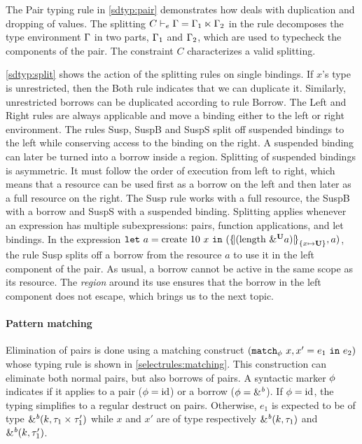 The {\sc Pair} typing rule in \cref{sdtyp:pair} demonstrates how \lang
deals with duplication and dropping of values.
The splitting $\lsplit{C}{\E}{\E_1}{\E_2}$ in the rule decomposes the
type environment $\E$ in two parts, $\E_1$ and $\E_2$, which are used
to typecheck the components of the pair.
The constraint $C$ characterizes a valid  splitting.

\cref{sdtyp:split} shows the action of the splitting rules on single
bindings. If $x$'s type is unrestricted, then
the {\sc Both} rule indicates that we can duplicate it.
Similarly, unrestricted borrows can be duplicated according to rule
{\sc Borrow}.
The {\sc Left} and {\sc Right} rules are always applicable and move a binding
either to the left or right environment.
The rules {\sc Susp}, {\sc SuspB} and {\sc SuspS}
split off suspended bindings to
the left while conserving access to the binding on the right.
A suspended binding can later be turned
into a borrow inside a region. Splitting of suspended bindings is
asymmetric. It must follow the order of execution from left to right,
which means that a resource can be used first as a borrow on the left
and then later as a full resource on the right. The {\sc Susp} rule
works with a full resource, the {\sc SuspB}
with a borrow and {\sc SuspS} with a suspended binding.
%
Splitting applies whenever an
expression has multiple subexpressions:  pairs, function applications,
and let bindings. In the
expression
$\letin{a}{\text{create}\ 10\ x}
{\introPair{\region[{}]{\Sone x\IBORROW}{\app{\text{length}}{\borrow[\IBORROW]{a}}}}{a}}$,
the rule {\sc Susp} splits off a borrow from  the resource
$a$ to use it in the left component of the pair.
As usual, a borrow cannot be active in the same scope as its resource.
The \emph{region} around its use ensures that the borrow in the left component does not
escape, which brings us to the next topic.


\paragraph{Pattern matching}
\label{sdtyping:matching}

Elimination of pairs is done using a matching construct 
$(\matchin{x,x'}{e_1}{e_2})$ whose
typing rule is shown in \cref{selectrules:matching}.
This construction can eliminate both normal pairs, but also borrows
of pairs.
A syntactic marker $\etransfm$ indicates if it applies to
a pair ($\etransfm = \operatorname{id}$) or a borrow ($\etransfm = \&^\BORROW$).
If $\etransfm = \operatorname{id}$, the typing simplifies to
a regular destruct on pairs.
Otherwise, $e_1$ is expected to be of type
$\borrowty{k}{\tyPair{\tau_1}{\tau'_1}}$
while $x$ and $x'$ are of type respectively
$\borrowty{k}{\tau_1}$ and $\borrowty{k}{\tau'_1}$.

